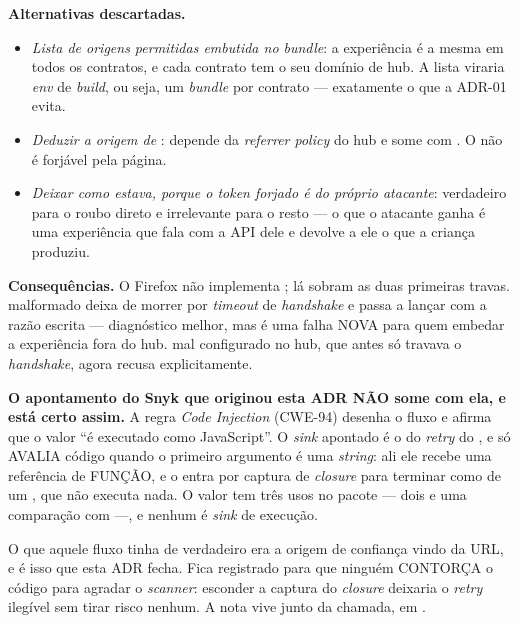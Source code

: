 \textbf{Alternativas descartadas.}
\begin{itemize}
  \item \emph{Lista de origens permitidas embutida no \emph{bundle}}: a
    experiência é a mesma em todos os contratos, e cada contrato tem o seu
    domínio de hub. A lista viraria \emph{env} de \emph{build}, ou seja, um
    \emph{bundle} por contrato --- exatamente o que a ADR-01 evita.
  \item \emph{Deduzir a origem de }: depende da
    \emph{referrer policy} do hub e some com . O
     não é forjável pela página.
  \item \emph{Deixar como estava, porque o \emph{token} forjado é do próprio
    atacante}: verdadeiro para o roubo direto e irrelevante para o resto ---
    o que o atacante ganha é uma experiência que fala com a API dele e devolve
    a ele o que a criança produziu.
\end{itemize}

\textbf{Consequências.} O Firefox não implementa ; lá
sobram as duas primeiras travas.  malformado deixa de morrer por
\emph{timeout} de \emph{handshake} e passa a lançar com a razão escrita ---
diagnóstico melhor, mas é uma falha NOVA para quem embedar a experiência fora
do hub.  mal configurado no hub, que antes só travava o
\emph{handshake}, agora recusa explicitamente.

\begin{nota}
\textbf{O apontamento do Snyk que originou esta ADR NÃO some com ela, e está
certo assim.} A regra \emph{Code Injection} (CWE-94) desenha o fluxo
 \seta{}  e afirma que o valor ``é
executado como JavaScript''. O \emph{sink} apontado é o
 do \emph{retry} do
, e  só AVALIA código quando o primeiro
argumento é uma \emph{string}: ali ele recebe uma referência de FUNÇÃO, e o
 entra por captura de \emph{closure} para terminar como
 de um , que não executa nada. O valor tem
três usos no pacote --- dois  e uma comparação com
 ---, e nenhum é \emph{sink} de execução.

O que aquele fluxo tinha de verdadeiro era a origem de confiança vindo da URL, e
é isso que esta ADR fecha. Fica registrado para que ninguém CONTORÇA o código
para agradar o \emph{scanner}: esconder a captura do \emph{closure} deixaria o
\emph{retry} ilegível sem tirar risco nenhum. A nota vive junto da chamada, em
.
\end{nota}

